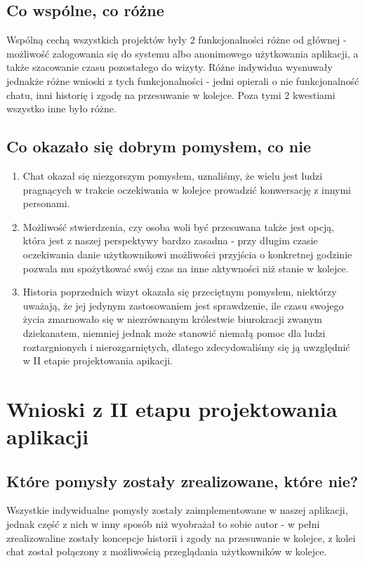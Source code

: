 \documentclass[12pt]{article}
\begin{document}
\subsection {Co wspólne, co różne}
Wspólną cechą wszystkich projektów były 2 funkcjonalności różne od głównej - możliwość zalogowania się do systemu albo anonimowego użytkowania aplikacji, a także szacowanie czasu pozostałego do wizyty. Różne indywidua wysnuwały jednakże różne wnioski z tych funkcjonalności - jedni opierali o nie funkcjonalność chatu, inni historię i zgodę na przesuwanie w kolejce. Poza tymi 2 kwestiami wszystko inne było różne.

\subsection{Co okazało się dobrym pomysłem, co nie}
\begin {enumerate}
	\item Chat okazał się niezgorszym pomysłem, uznaliśmy, że wielu jest ludzi pragnących w trakcie oczekiwania w kolejce prowadzić konwersację z innymi personami. 
	
	\item Możliwość stwierdzenia, czy osoba woli być przesuwana także jest opcją, która jest z naszej perspektywy bardzo zasadna - przy długim czasie oczekiwania danie użytkownikowi możliwości przyjścia o konkretnej godzinie pozwala mu spożytkować swój czas na inne aktywności niż stanie w kolejce.
	
	\item Historia poprzednich wizyt okazała się przeciętnym pomysłem, niektórzy uważają, że jej jedynym zastosowaniem jest sprawdzenie, ile czasu swojego życia zmarnowało się w niezrównanym królestwie biurokracji zwanym dziekanatem, niemniej jednak może stanowić niemałą pomoc dla ludzi roztargnionych i nierozgarniętych, dlatego zdecydowaliśmy się ją uwzględnić w II etapie projektowania apikacji.
	
\end {enumerate}

\section {Wnioski z II etapu projektowania aplikacji}
\subsection {Które pomysły zostały zrealizowane, które nie?}

Wszystkie indywidualne pomysły zostały zaimplementowane w naszej aplikacji, jednak część z nich w inny sposób niż wyobrażał to sobie autor - w pełni zrealizowaline zostały koncepcje historii i zgody na przesuwanie w kolejce, z kolei chat został połączony z możliwością przeglądania użytkowników w kolejce.
\end{document}
